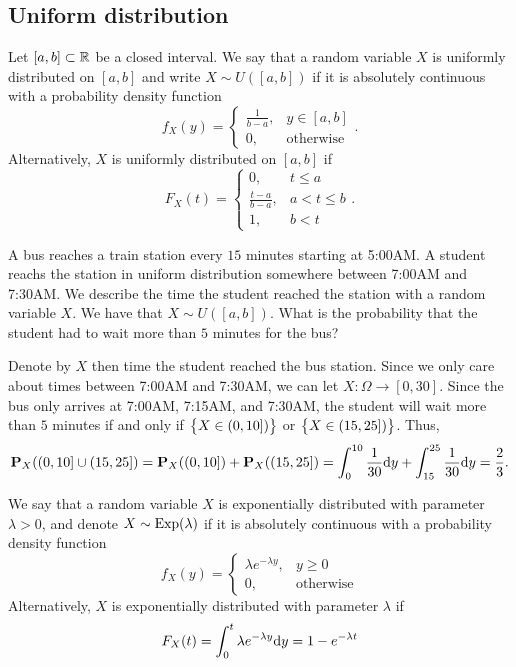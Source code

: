 \documentclass[11pt,a4paper]{article}
\begin{document}
\subsection{Uniform distribution}
\begin{definition}
  Let $[a,b] \subset \mathbb{R}$ be a closed interval. We say that a random 
  variable $X$ is uniformly distributed on $[a,b]$ and write $X \sim U([a,b])$
  if it is absolutely continuous with a probability density function
  \[
    f_X(y) =
    \begin{cases}
      \frac{1}{b-a}, &y \in [a,b] \\
      0, &\text{otherwise}
    \end{cases}.
  \]
  Alternatively, $X$ is uniformly distributed on $[a,b]$ if
  \[
    F_X(t) =
    \begin{cases}
      0, &t \le a \\
      \frac{t-a}{b-a}, &a < t \le b \\
      1, &b < t
    \end{cases}.
  \]
\end{definition}

\begin{exercise}
  A bus reaches a train station every $15$ minutes starting at 5:00AM.
  A student reachs the station in uniform distribution somewhere between
  7:00AM and 7:30AM. We describe the time the student reached the station
  with a random variable $X$. We have that $X \sim U([a,b])$. What
  is the probability that the student had to wait more than $5$ minutes
  for the bus?
\end{exercise}
\begin{solution}
  Denote by $X$ then time the student reached the bus station.
  Since we only care about times between 7:00AM and 7:30AM,
  we can let $X \colon \Omega \to [0,30]$.
  Since the bus only arrives at 7:00AM, 7:15AM, and 7:30AM,
  the student will wait more than $5$ minutes if and only if
  $\left\{X \in (0,10])\right\}$ or $\left\{X \in (15,25])\right\}$.
  Thus,
  \[
    \Prob_X((0,10] \cup (15,25]) =
    \Prob_X((0,10]) + \Prob_X((15,25]) =
    \int_{0}^{10} \frac{1}{30} \dy + \int_{15}^{25} \frac{1}{30} \dy =
    \frac{2}{3}.
  \]
\end{solution}

\begin{definition}
  We say that a random variable $X$ is exponentially distributed with parameter
  $\lambda > 0$, and denote $X \sim \operatorname{Exp}(\lambda)$
  if it is absolutely continuous with a probability density function
  \[
    f_X(y) =
    \begin{cases}
      \lambda e^{-\lambda y}, &y \geq 0 \\
      0, &\text{otherwise}
    \end{cases}
  \]
  Alternatively, $X$ is exponentially distributed with parameter $\lambda$ if
  \[
    F_X(t) = \int_{0}^{t} \lambda e^{-\lambda y} \dy = 1 - e^{-\lambda t}
  \]
\end{definition}
\end{document}
